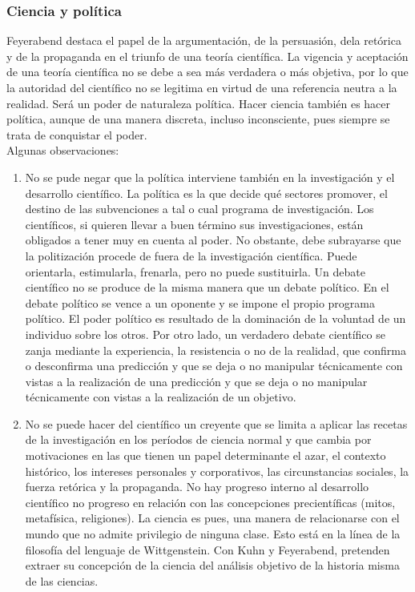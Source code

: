 \documentclass[a4paper, 11pt, twocolumn, spanish]{article}
\begin{document}
\subsubsection{Ciencia y política}
\label{sec:org35610cf}
Feyerabend destaca el papel de la argumentación, de la persuasión,
dela retórica y de la propaganda en el triunfo de una teoría
científica. La vigencia y aceptación de una teoría científica no se
debe a sea más verdadera o más objetiva, por lo que la autoridad del
científico no se legitima en virtud de una referencia neutra a la
realidad. Será un poder de naturaleza política. Hacer ciencia también
es hacer política, aunque de una manera discreta, incluso
inconsciente, pues siempre se trata de conquistar el poder.\\[0pt]
Algunas observaciones:
\begin{enumerate}
\item No se pude negar que la política interviene también en la
investigación y el desarrollo científico. La política es la que
decide qué sectores promover, el destino de las subvenciones a
tal o cual programa de investigación. Los científicos, si quieren
llevar a buen término sus investigaciones, están obligados a
tener muy en cuenta al poder. No obstante, debe subrayarse que la
politización procede de fuera de la investigación
científica. Puede orientarla, estimularla, frenarla, pero no
puede sustituirla. Un debate científico no se produce de la misma
manera que un debate político. En el debate político se vence a
un oponente y se impone el propio programa político. El poder
político es resultado de la dominación de la voluntad de un
individuo sobre los otros. Por otro lado, un verdadero debate
científico se zanja mediante la experiencia, la resistencia o no
de la realidad, que confirma o desconfirma una predicción y que
se deja o no manipular técnicamente con vistas a la realización
de una predicción y que se deja o no manipular técnicamente con
vistas a la realización de un objetivo.
\item No se puede hacer del científico un creyente que se limita a
aplicar las recetas de la investigación en los períodos de
ciencia normal y que cambia por motivaciones en las que tienen un
papel determinante el azar, el contexto histórico, los intereses
personales y corporativos, las circunstancias sociales, la fuerza
retórica y la propaganda. No hay progreso interno al desarrollo
científico no progreso en relación con las concepciones
precientíficas (mitos, metafísica, religiones). La ciencia es
pues, una manera de relacionarse con el mundo que no admite
privilegio de ninguna clase. Esto está en la línea de la
filosofía del lenguaje de Wittgenstein. Con Kuhn y Feyerabend,
pretenden extraer su concepción de la ciencia del análisis
objetivo de la historia misma de las ciencias.
\end{enumerate}
\end{document}
